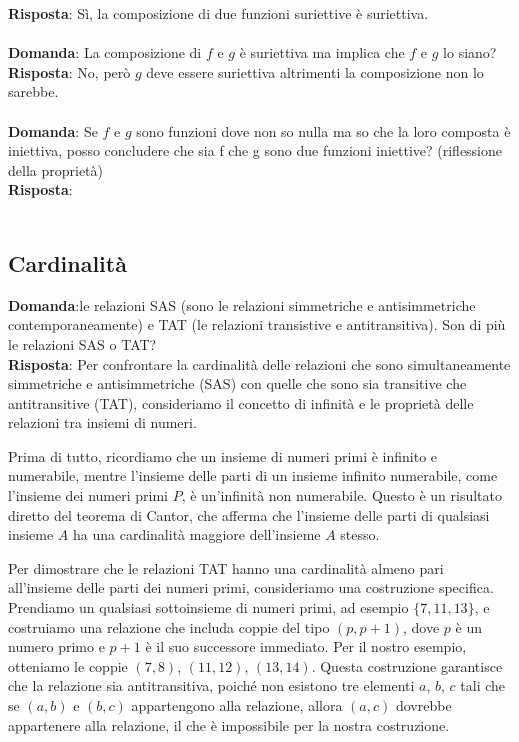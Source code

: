 \documentclass{article}
\begin{document}
\textbf{Risposta}: Sì, la composizione di due funzioni suriettive è suriettiva. \\ \\
\textbf{Domanda}: La composizione di $f$ e $g$ è suriettiva ma implica che $f$ e $g$ lo siano? \\
\textbf{Risposta}: No, però $g$ deve essere suriettiva altrimenti la composizione non lo sarebbe. \\ \\
\textbf{Domanda}: Se $f$ e $g$ sono funzioni dove non so nulla ma so che la loro composta è iniettiva, posso concludere che sia f che g sono due funzioni iniettive? (riflessione della proprietà)\\
\textbf{Risposta}: \\ \\

\subsection{Cardinalità}
\textbf{Domanda}:le relazioni SAS (sono le relazioni simmetriche e antisimmetriche contemporaneamente) e TAT (le relazioni transistive e antitransitiva). Son di più le relazioni SAS o TAT? \\
\textbf{Risposta}: Per confrontare la cardinalità delle relazioni che sono simultaneamente simmetriche e antisimmetriche (SAS) con quelle che sono sia transitive che antitransitive (TAT), consideriamo il concetto di infinità e le proprietà delle relazioni tra insiemi di numeri.

Prima di tutto, ricordiamo che un insieme di numeri primi è infinito e numerabile, mentre l'insieme delle parti di un insieme infinito numerabile, come l'insieme dei numeri primi \(P\), è un'infinità non numerabile. Questo è un risultato diretto del teorema di Cantor, che afferma che l'insieme delle parti di qualsiasi insieme \(A\) ha una cardinalità maggiore dell'insieme \(A\) stesso.

Per dimostrare che le relazioni TAT hanno una cardinalità almeno pari all'insieme delle parti dei numeri primi, consideriamo una costruzione specifica. Prendiamo un qualsiasi sottoinsieme di numeri primi, ad esempio \(\{7, 11, 13\}\), e costruiamo una relazione che includa coppie del tipo \((p, p+1)\), dove \(p\) è un numero primo e \(p+1\) è il suo successore immediato. Per il nostro esempio, otteniamo le coppie \((7, 8)\), \((11, 12)\), \((13, 14)\). Questa costruzione garantisce che la relazione sia antitransitiva, poiché non esistono tre elementi \(a\), \(b\), \(c\) tali che se \((a, b)\) e \((b, c)\) appartengono alla relazione, allora \((a, c)\) dovrebbe appartenere alla relazione, il che è impossibile per la nostra costruzione.
\end{document}
